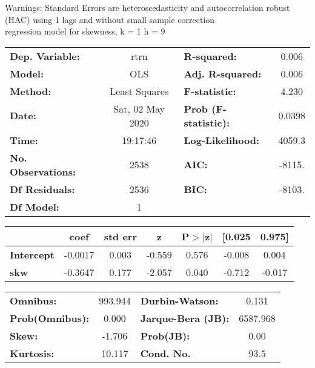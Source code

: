 Warnings: \newline
 [1] Standard Errors are heteroscedasticity and autocorrelation robust (HAC) using 1 lags and without small sample correction\\ 

regression model for skewness, k = 1 h = 9\begin{center}
\begin{tabular}{lclc}
\toprule
\textbf{Dep. Variable:}    &       rtrn       & \textbf{  R-squared:         } &     0.006   \\
\textbf{Model:}            &       OLS        & \textbf{  Adj. R-squared:    } &     0.006   \\
\textbf{Method:}           &  Least Squares   & \textbf{  F-statistic:       } &     4.230   \\
\textbf{Date:}             & Sat, 02 May 2020 & \textbf{  Prob (F-statistic):} &   0.0398    \\
\textbf{Time:}             &     19:17:46     & \textbf{  Log-Likelihood:    } &    4059.3   \\
\textbf{No. Observations:} &        2538      & \textbf{  AIC:               } &    -8115.   \\
\textbf{Df Residuals:}     &        2536      & \textbf{  BIC:               } &    -8103.   \\
\textbf{Df Model:}         &           1      & \textbf{                     } &             \\
\bottomrule
\end{tabular}
\begin{tabular}{lcccccc}
                   & \textbf{coef} & \textbf{std err} & \textbf{z} & \textbf{P$> |$z$|$} & \textbf{[0.025} & \textbf{0.975]}  \\
\midrule
\textbf{Intercept} &      -0.0017  &        0.003     &    -0.559  &         0.576        &       -0.008    &        0.004     \\
\textbf{skw}       &      -0.3647  &        0.177     &    -2.057  &         0.040        &       -0.712    &       -0.017     \\
\bottomrule
\end{tabular}
\begin{tabular}{lclc}
\textbf{Omnibus:}       & 993.944 & \textbf{  Durbin-Watson:     } &    0.131  \\
\textbf{Prob(Omnibus):} &   0.000 & \textbf{  Jarque-Bera (JB):  } & 6587.968  \\
\textbf{Skew:}          &  -1.706 & \textbf{  Prob(JB):          } &     0.00  \\
\textbf{Kurtosis:}      &  10.117 & \textbf{  Cond. No.          } &     93.5  \\
\bottomrule
\end{tabular}
\end{center}

